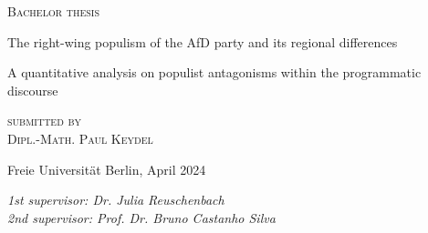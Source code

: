 \documentclass[a4paper]{scrreprt}
\begin{document}
\begin{titlepage}
\centering
{\large\textsc{Bachelor thesis}\par}
\vspace{8\baselineskip}
{\Huge The right-wing populism of the AfD party and its regional differences\par}
\vspace{2\baselineskip}
{\Large A quantitative analysis on populist antagonisms within the programmatic discourse\par}
\vspace{5\baselineskip}
{\large\textsc{submitted by\\[.5em]Dipl.-Math. Paul Keydel}\par}
\vspace{8\baselineskip}
{Freie Universität Berlin, April 2024\par}
\vfill
\raggedright
{\em 1st supervisor: Dr. Julia Reuschenbach\\}
{\em 2nd supervisor: Prof. Dr. Bruno Castanho Silva}
\end{titlepage}

\tableofcontents

\end{document}
